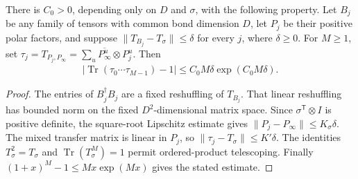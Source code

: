 \begin{lemma}
    \label{thm:ldp_inhomogeneous_mixed_overlap}
    \leanok
    There is $C_0>0$, depending only on $D$ and $\sigma$, with the following
    property. Let $B_j$ be any family of tensors with common bond dimension
    $D$, let $P_j$ be their positive polar factors, and suppose
    $\|T_{B_j}-T_\sigma\|\le\delta$ for every $j$, where $\delta\ge0$.
    For $M\ge1$, set
    $\tau_j=T_{P_j,P_\infty}=\sum_u\overline{P_\infty^u}\otimes P_j^u$.
    Then
    \begin{align}
        \left|\operatorname{Tr}(\tau_0\cdots\tau_{M-1})-1\right|
        \le C_0M\delta\exp(C_0M\delta).
    \end{align}
\end{lemma}
\begin{proof}\leanok
    The entries of $B_j^\dagger B_j$ are a fixed reshuffling of $T_{B_j}$.
    That linear reshuffling has bounded norm on the fixed $D^2$-dimensional
    matrix space. Since $\sigma^\mathsf T\otimes I$ is positive definite,
    the square-root Lipschitz estimate gives
    $\|P_j-P_\infty\|\le K_\sigma\delta$.
    The mixed transfer matrix is linear in $P_j$, so
    $\|\tau_j-T_\sigma\|\le K'\delta$.
    The identities $T_\sigma^2=T_\sigma$ and
    $\operatorname{Tr}(T_\sigma^M)=1$ permit ordered-product telescoping.
    Finally $(1+x)^M-1\le Mx\exp(Mx)$ gives the stated estimate.
\end{proof}

